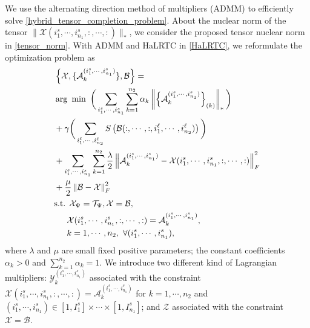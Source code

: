 \documentclass[12pt, draftcls, onecolumn]{IEEEtran}
\theoremstyle{plain}
\theoremstyle{definition}
\theoremstyle{remark}
\begin{document}
We use the alternating direction method of multipliers (ADMM) \cite{Boyd:2011:DOS:2185815.2185816} to efficiently solve \eqref{hybrid_tensor_completion_problem}.
About the nuclear norm of the tensor $\lVert \mathcal{X}(i^s_{1},\cdots,i^s_{n_1},:,\cdots,:)\rVert_*$, 
we consider the proposed tensor nuclear norm in \eqref{tensor_norm}. 
With ADMM and HaLRTC in \eqref{HaLRTC}, we reformulate the optimization problem as
\begin{align}
\label{Lagrange_form_optimization_problem}
	\nonumber
	&\left\{\mathcal{X},\{\mathcal{A}^{(i^s_{1},\cdots,i^s_{n_1})}_k\},\mathcal{B}\right\}=\\ 
	\nonumber
    &\arg\ \min\  \bigg(\sum_{i^s_{1},\cdots,i^s_{n_1}}\sum_{k=1}^{n_2}\alpha_k\left\Vert \left\{\mathcal{A}^{(i^s_{1},\cdots,i^s_{n_1})}_k\right\}_{(k)}\right\Vert_*\bigg)\\
	\nonumber
    &+\gamma \bigg(\sum_{i^{\ell}_{1},\cdots,i^{\ell}_{n_2}}{S}\left(\mathcal{B}(:,\cdots,:,i^{\ell}_{1},\cdots,i^{\ell}_{n_2})\right)\bigg)\\
	\nonumber
    &+\sum_{i^s_{1},\cdots,i^s_{n_1}}\sum_{k=1}^{n_2}{\frac{\lambda}{2}\left\Vert\mathcal{A}^{(i^s_{1},\cdots,i^s_{n_1})}_k-\mathcal{X}(i^s_{1},\cdots,i^s_{n_1},:,\cdots,:)\right\Vert_F^2}\\
    \nonumber
    &+\frac{\mu}{2}\left\Vert\mathcal{B}-\mathcal{X}\right\Vert_F^2\\
    &\text{s.t. }
    			\nonumber
                \mathcal{X}_\Psi = \mathcal{T}_\Psi, \mathcal{X} = \mathcal{B},\\
                \nonumber
                & \hspace{1.5em}\mathcal{X}(i^s_{1},\cdots,i^s_{n_1},:,\cdots,:) = \mathcal{A}^{(i^s_{1},\cdots,i^s_{n_1})}_k,\\
                & \hspace{1.5em}k=1,\cdots,n_2,\ \forall(i^s_{1},\cdots,i^s_{n_1}),
\end{align}
where $\lambda$ and $\mu$ are small fixed positive parameters; the constant coefficients $\alpha_k>0$ and $\sum_{k=1}^{n_2} \alpha_k =1$.
We introduce two different kind of Lagrangian multipliers: $\mathcal{Y}^{(i^s_{1},\cdots,i^s_{n_1})}_k$ associated with the constraint $\mathcal{X}(i^s_{1},\cdots,i^s_{n_1},:,\cdots,:)=\mathcal{A}^{(i^s_{1},\cdots,i^s_{n_1})}_k$ for $k=1,\cdots,n_2$ and $(i^s_{1},\cdots,i^s_{n_1})\in[1,I^s_{1}]\times\cdots\times[1,I^s_{n_1}]$; and $\mathcal{Z}$ associated with the constraint $\mathcal{X} = \mathcal{B}$.
\end{document}
